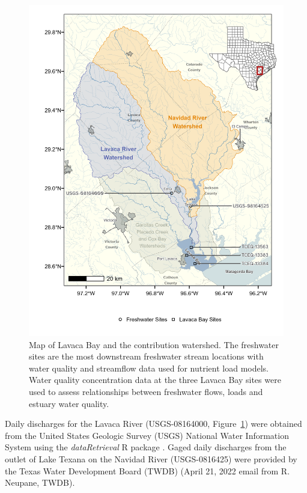 \documentclass[sn-basic,referee,lineno,pdflatex]{sn-jnl}
\begin{document}
\begin{figure}

{\centering \includegraphics[width=5.2in,]{../fig1} 

}

\caption{Map of Lavaca Bay and the contribution watershed. The freshwater sites are the most downstream freshwater stream locations with water quality and streamflow data used for nutrient load models. Water quality concentration data at the three Lavaca Bay sites were used to assess relationships between freshwater flows, loads and estuary water quality.}\label{fig:fig1}
\end{figure}

Daily discharges for the Lavaca River (USGS-08164000,
Figure~\ref{fig:fig1}) were obtained from the United States Geologic
Survey (USGS) National Water Information System using the
\emph{dataRetrieval} R package
\citep{deciccoDataRetrievalPackagesDiscovering2022}. Gaged daily
discharges from the outlet of Lake Texana on the Navidad River
(USGS-0816425) were provided by the Texas Water Development Board (TWDB)
(April 21, 2022 email from R. Neupane, TWDB).
\end{document}
